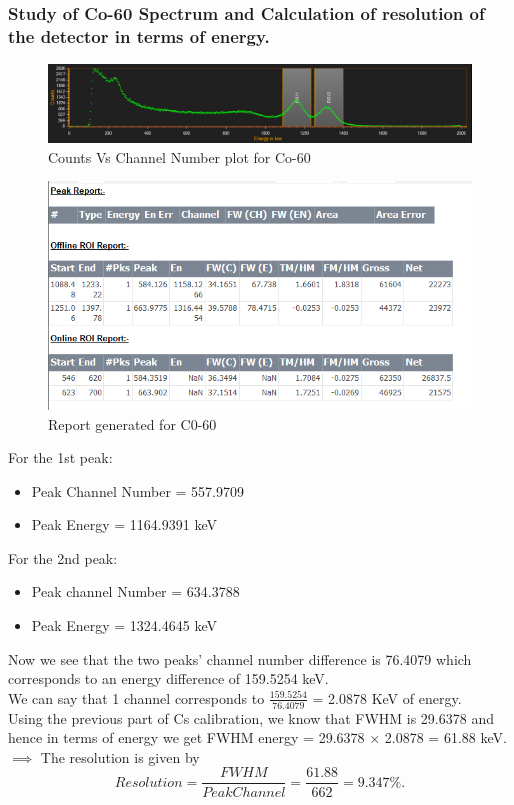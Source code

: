 \documentclass[%
 reprint,
nofootinbib,
 amsmath,amssymb,
 aps,
floatfix,
]{revtex4-2}
\begin{document}
\subsubsection*{Study of Co-60 Spectrum and Calculation of resolution of the detector in terms of energy.}
\begin{figure}[H]
    \centering
    \includegraphics[width = 8 cm]{Figures/Co-60_energyspectrum.PNG}
    \caption{Counts Vs Channel Number plot for Co-60}
    \label{fig:my_label}
\end{figure}
\begin{figure}
    \centering
    \includegraphics[scale = 0.3]{Figures/Co-60_report.PNG}
    \caption{Report generated for C0-60}
    \label{fig:my_label}
\end{figure}
\centering For the 1st peak:\\
\begin{itemize}
    \item Peak Channel Number = 557.9709
    \item Peak Energy = 1164.9391 keV
\end{itemize}

\centering For the 2nd peak:\\
\begin{itemize}
    \item Peak channel Number = 634.3788
    \item Peak Energy = 1324.4645 keV
\end{itemize}
Now we see that the two peaks' channel number difference is 76.4079 which corresponds to an energy difference of 159.5254 keV.\\
We can say that 1 channel corresponds to $\frac{159.5254}{76.4079}$ = 2.0878 KeV of energy.\\
Using the previous part of Cs calibration, we know that FWHM is 29.6378 and hence in terms of energy we get FWHM energy = 29.6378 $\times$ 2.0878 = 61.88 keV. \\
$\implies$ The resolution is given by\\
    \begin{dmath*}
        \textit{Resolution} = \frac{FWHM}{Peak Channel} = \frac{61.88}{662}
         = 9.347 \%.
    \end{dmath*}
    
\end{document}
